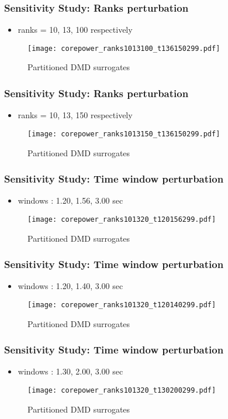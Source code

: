 \documentclass[fleqn]{beamer}
\begin{document}
\begin{frame}
\frametitle{Sensitivity Study: Ranks perturbation}
\begin{itemize}
 \item ranks = 10, 13, 100 respectively
\end{itemize}
\begin{figure}[ht]
\texttt{[image: corepower\_ranks1013100\_t136150299.pdf]}
\caption{Partitioned DMD surrogates}
\end{figure}
\end{frame}

\begin{frame}
\frametitle{Sensitivity Study: Ranks perturbation}
\begin{itemize}
 \item ranks = 10, 13, 150 respectively
\end{itemize}
\begin{figure}[ht]
\texttt{[image: corepower\_ranks1013150\_t136150299.pdf]}
\caption{Partitioned DMD surrogates}
\end{figure}
\end{frame}

\begin{frame}
\frametitle{Sensitivity Study: Time window perturbation}
\begin{itemize}
 \item windows : 1.20, 1.56, 3.00 sec
\end{itemize}
\begin{figure}[ht]
\texttt{[image: corepower\_ranks101320\_t120156299.pdf]}
\caption{Partitioned DMD surrogates}
\end{figure}
\end{frame}

\begin{frame}
\frametitle{Sensitivity Study: Time window perturbation}
\begin{itemize}
 \item windows : 1.20, 1.40, 3.00 sec
\end{itemize}
\begin{figure}[ht]
\texttt{[image: corepower\_ranks101320\_t120140299.pdf]}
\caption{Partitioned DMD surrogates}
\end{figure}
\end{frame}

\begin{frame}
\frametitle{Sensitivity Study: Time window perturbation}
\begin{itemize}
 \item windows : 1.30, 2.00, 3.00 sec
\end{itemize}
\begin{figure}[ht]
\texttt{[image: corepower\_ranks101320\_t130200299.pdf]}
\caption{Partitioned DMD surrogates}
\end{figure}
\end{frame}
\end{document}
